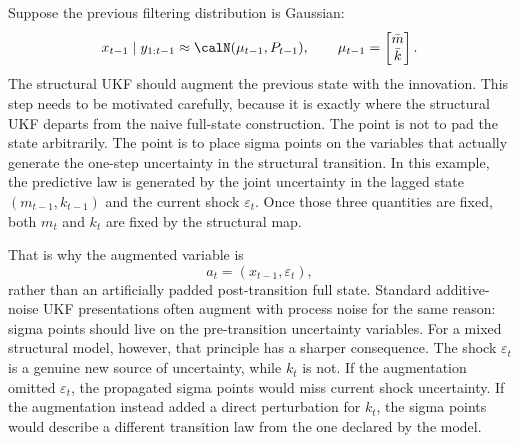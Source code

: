 Suppose the previous filtering distribution is Gaussian:
\[
  x_{t-1}\mid y_{1:t-1}
  \approx \calN(\mu_{t-1},P_{t-1}),
  \qquad
  \mu_{t-1}=
  \begin{bmatrix}\bar m\\ \bar k\end{bmatrix}.
\]
The structural UKF should augment the previous state with the innovation.  This
step needs to be motivated carefully, because it is exactly where the structural
UKF departs from the naive full-state construction.  The point is not to pad the
state arbitrarily.  The point is to place sigma points on the variables that
actually generate the one-step uncertainty in the structural transition.  In
this example, the predictive law is generated by the joint uncertainty in the
lagged state $(m_{t-1},k_{t-1})$ and the current shock $\varepsilon_t$.  Once
those three quantities are fixed, both $m_t$ and $k_t$ are fixed by the
structural map.

That is why the augmented variable is
\begin{equation}
  a_t=(x_{t-1},\varepsilon_t),
  \label{eq:bf-ukf-augmented-variable}
\end{equation}
rather than an artificially padded post-transition full state.  Standard
additive-noise UKF presentations often augment with process noise for the same
reason: sigma points should live on the pre-transition uncertainty variables.
For a mixed structural model, however, that principle has a sharper consequence.
The shock $\varepsilon_t$ is a genuine new source of uncertainty, while $k_t$
is not.  If the augmentation omitted $\varepsilon_t$, the propagated sigma
points would miss current shock uncertainty.  If the augmentation instead added
a direct perturbation for $k_t$, the sigma points would describe a different
transition law from the one declared by the model.

